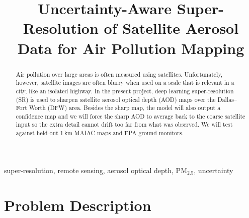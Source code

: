 \documentclass[conference]{IEEEtran}
\begin{document}
\title{Uncertainty-Aware Super-Resolution of Satellite Aerosol Data for Air Pollution Mapping}
\author{
}
\maketitle
\begin{abstract}
Air pollution over large areas is often measured using satellites. Unfortunately, however, satellite images are often blurry when used on a scale that is relevant in a city, like an isolated highway. In the present project, deep learning super-resolution (SR) is used to sharpen satellite aerosol optical depth (AOD) maps over the Dallas--Fort Worth (DFW) area. Besides the sharp map, the model will also output a confidence map and we will force the sharp AOD to average back to the coarse satellite input so the extra detail cannot drift too far from what was observed. We will test against held-out 1\,km MAIAC maps and EPA ground monitors. 
\end{abstract}
\begin{IEEEkeywords}
super-resolution, remote sensing, aerosol optical depth, PM$_{2.5}$, uncertainty
\end{IEEEkeywords}
\section{Problem Description}
\end{document}
